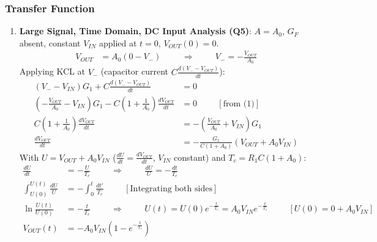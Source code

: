 \subsubsection{Transfer Function}
\begin{enumerate}
  \item \textbf{Large Signal, Time Domain, DC Input Analysis (Q5)}: \(A = A_0\), \(G_F\)
    absent, constant \(V_{IN}\) applied at \(t = 0\), \(V_{OUT}(0) = 0\).
    \begin{align*}
      V_{OUT} &= A_0(0 - V_-) \hspace{1cm} \Rightarrow \hspace{1cm} V_- = -\frac{V_{OUT}}{A_0} \tag{1}
    \end{align*}
    Applying KCL at \(V_-\) (capacitor current \(C\frac{d(V_- - V_{OUT})}{dt}\)):
    \begin{align*}
      (V_- - V_{IN}) G_1 + C\frac{d(V_- - V_{OUT})}{dt} &= 0 \\
      \left(-\frac{V_{OUT}}{A_0} - V_{IN}\right) G_1 - C\left(1 + \frac{1}{A_0}\right)\frac{dV_{OUT}}{dt} &= 0 \hspace{1cm} [\text{from (1)}] \\
      C\left(1 + \frac{1}{A_0}\right)\frac{dV_{OUT}}{dt} &= -\left(\frac{V_{OUT}}{A_0} + V_{IN}\right) G_1 \\
      \frac{dV_{OUT}}{dt} &= -\frac{G_1}{C(1 + A_0)}\left(V_{OUT} + A_0 V_{IN}\right)
    \end{align*}
    With \(U = V_{OUT} + A_0 V_{IN}\) (\(\frac{dU}{dt} = \frac{dV_{OUT}}{dt}\), \(V_{IN}\) constant) and
    \(T_c = R_1 C(1 + A_0)\):
    \begin{align*}
      \frac{dU}{dt} &= -\frac{U}{T_c} \hspace{1cm} \Rightarrow \hspace{1cm} \frac{dU}{U} = -\frac{dt}{T_c} \\
      \int_{U(0)}^{U(t)} \frac{dU}{U} &= -\int_0^t \frac{dt'}{T_c} \hspace{1cm} [\text{Integrating both sides}] \\
      \ln\frac{U(t)}{U(0)} &= -\frac{t}{T_c} \hspace{1cm} \Rightarrow \hspace{1cm} U(t) = U(0) e^{-\frac{t}{T_c}} = A_0 V_{IN} e^{-\frac{t}{T_c}} \hspace{1cm} [U(0) = 0 + A_0 V_{IN}] \\
      V_{OUT}(t) &= -A_0 V_{IN}\left(1 - e^{-\frac{t}{T_c}}\right) \tag{2}
    \end{align*}

\end{enumerate}
